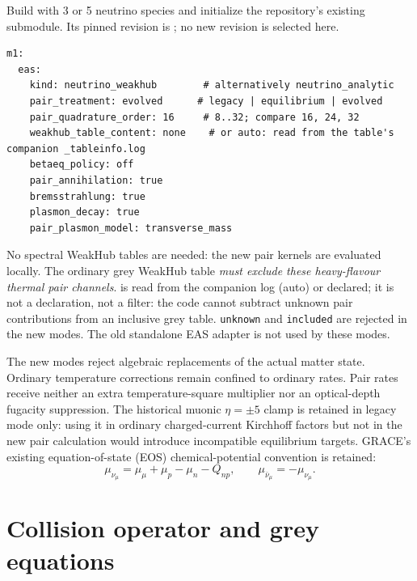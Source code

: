 \documentclass[11pt,a4paper]{article}
\newcommand{\code}[1]{\texttt{#1}}
\begin{document}
Build with 3 or 5 neutrino species and initialize the repository's existing
 submodule. Its pinned revision is
; no new revision is selected here.

\begin{lstlisting}
m1:
  eas:
    kind: neutrino_weakhub        # alternatively neutrino_analytic
    pair_treatment: evolved      # legacy | equilibrium | evolved
    pair_quadrature_order: 16     # 8..32; compare 16, 24, 32
    weakhub_table_content: none    # or auto: read from the table's companion _tableinfo.log
    betaeq_policy: off
    pair_annihilation: true
    bremsstrahlung: true
    plasmon_decay: true
    pair_plasmon_model: transverse_mass
\end{lstlisting}

No spectral WeakHub tables are needed: the new pair kernels are evaluated
locally. The ordinary grey WeakHub table \emph{must exclude these
heavy-flavour thermal pair channels}.  is read from the companion log (auto) or declared; it is not a
declaration, not a filter: the code cannot subtract unknown pair contributions
from an inclusive grey table. \code{unknown} and \code{included} are rejected
in the new modes. The old standalone  EAS adapter is not
used by these modes.

The new modes reject algebraic  replacements of the
actual matter state. Ordinary temperature corrections remain confined to
ordinary rates. Pair rates receive neither an extra temperature-square
multiplier nor an optical-depth fugacity suppression. The historical muonic
$\eta=\pm5$ clamp is retained in legacy mode only: using it in ordinary
charged-current Kirchhoff factors but not in the new pair calculation would
introduce incompatible equilibrium targets. GRACE's existing equation-of-state
(EOS) chemical-potential convention is retained:
\[
 \mu_{\nu_\mu}=\mu_\mu+\mu_p-\mu_n-Q_{np},\qquad
 \mu_{\bar\nu_\mu}=-\mu_{\nu_\mu}.
\]

\section{Collision operator and grey equations}
\end{document}
